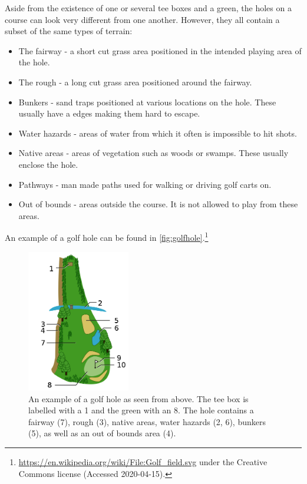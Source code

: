 \documentclass{kththesis}
\begin{document}
Aside from the existence of one or several tee boxes and a green, the holes on a course can look very different from one another. However, they all contain a subset of the same types of terrain:
\begin{itemize}
    \item The fairway - a short cut grass area positioned in the intended playing area of the hole. 
    \item The rough - a long cut grass area positioned around the fairway.
    \item Bunkers - sand traps positioned at various locations on the hole. These usually have a edges making them hard to escape.
    \item Water hazards - areas of water from which it often is impossible to hit shots.
    \item Native areas - areas of vegetation such as woods or swamps. These usually enclose the hole.
    \item Pathways - man made paths used for walking or driving golf carts on.
    \item Out of bounds - areas outside the course. It is not allowed to play from these areas.
\end{itemize}
An example of a golf hole can be found in \autoref{fig:golfhole}.\footnote{\url{https://en.wikipedia.org/wiki/File:Golf_field.svg} under the Creative Commons license (Accessed 2020-04-15).}

\begin{figure}
    \centering
    \includegraphics[width=0.4\textwidth]{golffield.png}
    \caption{An example of a golf hole as seen from above. The tee box is labelled with a 1 and the green with an 8. The hole contains a fairway (7), rough (3), native areas, water hazards (2, 6), bunkers (5), as well as an out of bounds area (4).}
    \label{fig:golfhole}
\end{figure}
\end{document}
